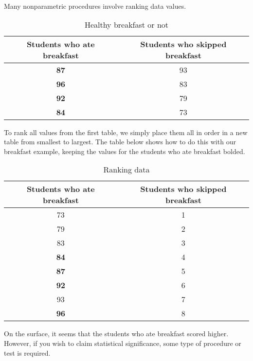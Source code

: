 Many nonparametric procedures involve ranking data values.
\begin{table}[h]
    \centering %
    \begin{tabular}{|c|c|} %
        \hline %
        Students who ate breakfast & Students who skipped breakfast \\ %
        \hline
        \textbf{87} & 93 \\
        \hline
        \textbf{96} & 83 \\ 
        \hline
        \textbf{92} & 79 \\
        \hline
        \textbf{84} & 73 \\
        \hline
    \end{tabular}
    \caption{Healthy breakfast or not} %
    \label{tab:breakfast} %
\end{table}
To rank all values from the first table, we simply place them all in order in a new table from smallest to largest. The table below shows how to do this with our breakfast example, keeping the values for the students who ate breakfast bolded.
\begin{table}[h]
    \centering %
    \begin{tabular}{|c|c|} %
        \hline %
        Students who ate breakfast & Students who skipped breakfast \\ %
        \hline
        73 & 1 \\
        \hline
        79 & 2 \\ 
        \hline
        83 & 3 \\
        \hline
        \textbf{84} & 4 \\
        \hline
        \textbf{87} & 5 \\
        \hline
        \textbf{92} & 6 \\
        93 & 7 \\
        \hline
        \textbf{96} & 8 \\
        \hline
    \end{tabular}
    \caption{Ranking data} %
    \label{tab:ranked_breakfast} %
\end{table}
On the surface, it seems that the students who ate breakfast scored higher. However, if you wish to claim statistical significance, some type of procedure or test is required.

